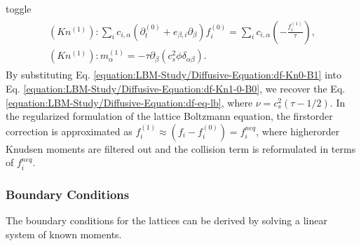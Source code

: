 \documentclass[letterpaper,10pt,english,openany,oneside]{jupyterBook}
\begin{document}
\begin{sphinxuseclass}{toggle}
\begin{equation}\label{equation:LBM-Study/Diffusive-Equation:df-Kn0-B1}
\begin{split}
\begin{array}{l}
(Kn^{(1)}): \displaystyle\sum_{i}c_{i,\alpha}\left( \partial_{t}^{(0)} + e_{\beta,i}\partial_{\beta} \right)f_{i}^{(0)}= \displaystyle\sum_{i} c_{i,\alpha} \left( -\frac{f_{i}^{(1)}}{\tau}  \right),\\
(Kn^{(1)}): m^{(1)}_{\alpha} =-\tau \partial_{\beta}\left( c_{s}^{2} \phi \delta_{\alpha\beta}  \right).
\end{array}
\end{split}
\end{equation}
\sphinxAtStartPar
By substituting Eq. \eqref{equation:LBM-Study/Diffusive-Equation:df-Kn0-B1} into Eq. \eqref{equation:LBM-Study/Diffusive-Equation:df-Kn1-0-B0}, we recover the Eq. \eqref{equation:LBM-Study/Diffusive-Equation:df-eq-lb}, where \(\nu=c_{s}^{2}(\tau-1/2)\). In the regularized formulation of the lattice Boltzmann equation, the first\sphinxhyphen{}order correction is approximated as \(f_{i}^{(1)}\approx (f_{i}-f_{i}^{(0)})=f_{i}^{neq}\), where higher\sphinxhyphen{}order Knudsen moments are filtered out and the collision term is reformulated in terms of \(f_{i}^{neq}\).

\end{sphinxuseclass}

\subsubsection{Boundary Conditions}
\label{\detokenize{LBM-Study/Diffusive-Equation:boundary-conditions}}
\sphinxAtStartPar
The boundary conditions for the lattices can be derived by solving a linear system of known moments.
\end{document}
